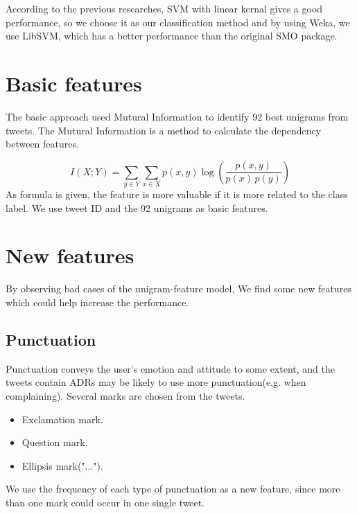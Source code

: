 \documentclass[11pt]{article}
\begin{document}
According to the previous researches, SVM with linear kernal gives
a good performance, so we choose it as our classification method
and by using Weka,
we use LibSVM\cite{CC01a},
which has a better performance than the original SMO package.

\section{Basic features}
The basic approach used Mutural Information to identify
92 best unigrams from tweets.
The Mutural Information is a method to calculate the dependency between features.

$${\displaystyle I(X;Y)=\sum _{y\in Y}\sum _{x\in X}p(x,y)\log {\left({\frac {p(x,y)}{p(x)\,p(y)}}\right)}}$$
As formula is given,
the feature is more valuable
if it is more related to the class label.
We use tweet ID and the 92 unigrams as basic features.


\section{New features}
By observing bad cases of the unigram-feature model,
We find some new features
which could help increase the performance.

\subsection{Punctuation}
Punctuation conveys the user's emotion and attitude to some extent,
and the tweets contain ADRs may be likely to use more punctuation(e.g. when complaining).
Several marks are chosen from the tweets.
\begin{itemize}
  \item Exclamation mark.
  \item Question mark.
  \item Ellipsis mark("...").
\end{itemize}

We use the frequency of each type of punctuation as a new feature,
since more than one mark could occur in one single tweet.

%
%
\end{document}
